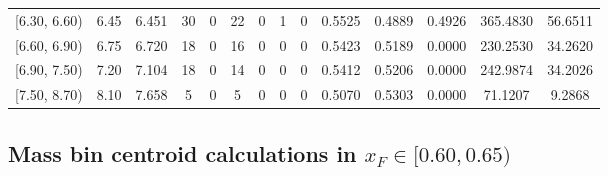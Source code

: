 \begin{table}[htbp]
{\begin{tabular}{cc|c|cccccc|ccc|cc}
        {[6.30, 6.60)} & 6.45 & 6.451 & 30 & 0 & 22 & 0 & 1 & 0 & 0.5525 & 0.4889 & 0.4926 & 365.4830 & 56.6511 \\
        {[6.60, 6.90)} & 6.75 & 6.720 & 18 & 0 & 16 & 0 & 0 & 0 & 0.5423 & 0.5189 & 0.0000 & 230.2530 & 34.2620 \\
        {[6.90, 7.50)} & 7.20 & 7.104 & 18 & 0 & 14 & 0 & 0 & 0 & 0.5412 & 0.5206 & 0.0000 & 242.9874 & 34.2026 \\
        {[7.50, 8.70)} & 8.10 & 7.658 & 5 & 0 & 5 & 0 & 0 & 0 & 0.5070 & 0.5303 & 0.0000 & 71.1207 & 9.2868 \\
        \hline\hline
    \end{tabular}
    }
\end{table}

\clearpage
\subsection{\texorpdfstring{Mass bin centroid calculations in $x_F \in [0.60, 0.65)$}{Mass bin centroid calculations in x\_F in [0.60, 0.65)]}}

